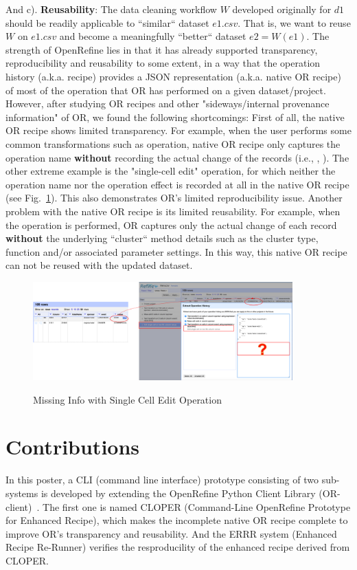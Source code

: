 \documentclass[runningheads]{llncs}
\begin{document}
 And c). \textbf{Reusability}: The data cleaning workflow $W$ developed originally for $d1$ should be readily applicable to “similar“ dataset $e1.csv$. That is, we want to reuse $W$ on $e1.csv$ and become a meaningfully “better“ dataset \(e2 = W(e1)\). The strength of OpenRefine lies in that it has already supported transparency, reproducibility and reusability to some extent, in a way that the operation history (a.k.a. recipe) provides a JSON representation (a.k.a. native OR recipe) of most of the operation that OR has performed on a given dataset/project. However, after studying OR recipes and other "sideways/internal provenance information" of OR, we found the following shortcomings: First of all, the native OR recipe shows limited transparency. For example, when the user performs some common transformations such as   operation, native OR recipe only captures the operation name \textbf{without} recording the actual change of the records (i.e., , ). The other extreme example is the "single-cell edit" operation, for which neither the operation name nor the operation effect is recorded at all in the native OR recipe (see Fig.~\ref{fig2}). This also demonstrates OR's limited reproducibility issue. Another problem with the native OR recipe is its limited reusability. For example, when the  operation is performed, OR captures only the actual change of each record \textbf{without} the underlying “cluster“ method details such as the cluster type, function and/or associated parameter settings. In this way, this native OR recipe can not be reused with the updated dataset.


\begin{figure}
\centering
\includegraphics[width=100mm]{figs/singleedit.png}\
\caption{Missing Info with Single Cell Edit Operation} \label{fig2}
\end{figure}


\section{Contributions}
In this poster, a CLI (command line interface) prototype consisting of two sub-systems is developed by extending the OpenRefine Python Client Library (OR-client)~\cite{ref_url1}. The first one is named CLOPER (Command-Line OpenRefine Prototype for Enhanced Recipe), which makes the incomplete native OR recipe complete to improve OR's transparency and reusability. And the ERRR system (Enhanced Recipe Re-Runner) verifies the resproducility of the enhanced recipe derived from CLOPER.
\end{document}
